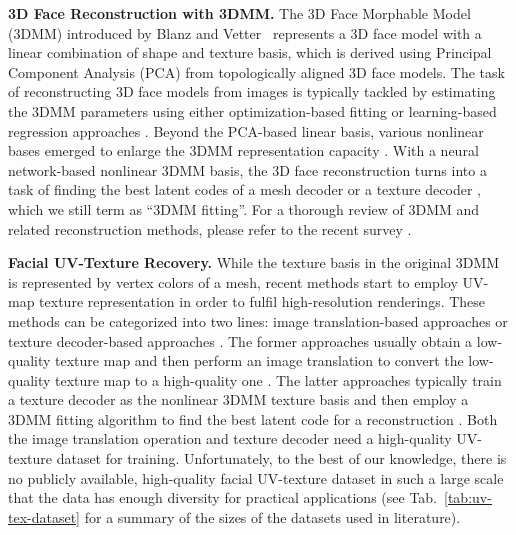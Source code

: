 \documentclass[10pt,twocolumn,letterpaper]{article}
\begin{document}
\noindent\textbf{3D Face Reconstruction with 3DMM.}
The 3D Face Morphable Model (3DMM) introduced by Blanz and Vetter~\cite{blanz1999morphable} represents a 3D face model with a linear combination of shape and texture basis, which is derived using Principal Component Analysis (PCA) from topologically aligned 3D face models. 
The task of reconstructing 3D face models from images is typically tackled by estimating the 3DMM parameters using either optimization-based fitting or learning-based regression approaches \cite{Zollhoefer2018FaceSTAR,egger20203d}. 
Beyond the PCA-based linear basis, various nonlinear bases emerged to enlarge the 3DMM representation capacity \cite{tran2018nonlinear,bouritsas2019neural,moschoglou20203dfacegan,gecer2019ganfit,jiang2019disentangled,wang2022faceverse,qiu2022sculptor}. 
With a neural network-based nonlinear 3DMM basis, the 3D face reconstruction turns into a task of finding the best latent codes of a mesh decoder \cite{bouritsas2019neural} or a texture decoder \cite{gecer2019ganfit}, which we still term as ``3DMM fitting''. 
For a thorough review of 3DMM and related reconstruction methods, please refer to the recent survey \cite{egger20203d}. 


\vspace{1mm}
\noindent\textbf{Facial UV-Texture Recovery.}
While the texture basis in the original 3DMM~\cite{blanz1999morphable} is represented by vertex colors of a mesh, recent methods \cite{saito2017photorealistic,yamaguchi2018high,gecer2019ganfit,lattas2020avatarme,bao2021high,luo2021normalized,lee2020uncertainty, lin2022high, chung2022stylefaceuv} start to employ UV-map texture representation in order to fulfil high-resolution renderings. 
These methods can be categorized into two lines: image translation-based approaches \cite{saito2017photorealistic,yamaguchi2018high,lattas2020avatarme,bao2021high} or texture decoder-based approaches \cite{gecer2019ganfit,lee2020uncertainty,luo2021normalized}. 
The former approaches usually obtain a low-quality texture map and then perform an image translation to convert the low-quality texture map to a high-quality one \cite{saito2017photorealistic,yamaguchi2018high,lattas2020avatarme,bao2021high}. 
The latter approaches typically train a texture decoder as the nonlinear 3DMM texture basis and then employ a 3DMM fitting algorithm to find the best latent code for a reconstruction \cite{gecer2019ganfit,lee2020uncertainty,luo2021normalized}. 
Both the image translation operation and texture decoder need a high-quality UV-texture dataset for training. 
Unfortunately, to the best of our knowledge, there is no publicly available, high-quality facial UV-texture dataset in such a large scale that the data has enough diversity for practical applications (see Tab.~\ref{tab:uv-tex-dataset} for a summary of the sizes of the datasets used in literature). 
\end{document}
